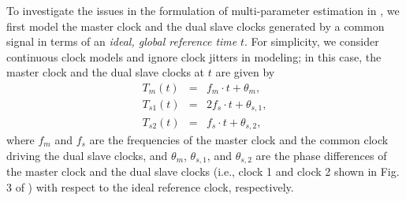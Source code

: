 \documentclass[journal,twoside,final]{IEEEtran}
\begin{document}
To investigate the issues in the formulation of multi-parameter estimation in
\cite{chin09:_ieee}, we first model the master clock and the dual slave clocks
generated by a common signal in terms of an \emph{ideal, global reference time}
\(t\).
For simplicity, we consider continuous clock models and ignore clock jitters in
modeling; in this case, the master clock and the dual slave clocks at $t$ are
given by
\begingroup
\setlength{\arraycolsep}{0.0em}
\begin{eqnarray}
  T_{m}(t) &{=}& f_{m} \cdot t + \theta_{m}, \label{eq:ref_master_clock} \\
  T_{s1}(t) &{=}& 2f_{s} \cdot t + \theta_{s,1}, \label{eq:ref_slave_clock1} \\
  T_{s2}(t) &{=}& f_{s} \cdot t + \theta_{s,2}, \label{eq:ref_slave_clock2}
\end{eqnarray}
\endgroup
where $f_{m}$ and $f_{s}$ are the frequencies of the master clock and the common
clock driving the dual slave clocks, and $\theta_{m}$, $\theta_{s,1}$, and
$\theta_{s,2}$ are the phase differences of the master clock and the dual slave
clocks (i.e., clock 1 and clock 2 shown in Fig.\(~\)3
of \cite{chin09:_ieee}) with respect to the ideal reference clock, respectively.
\end{document}

